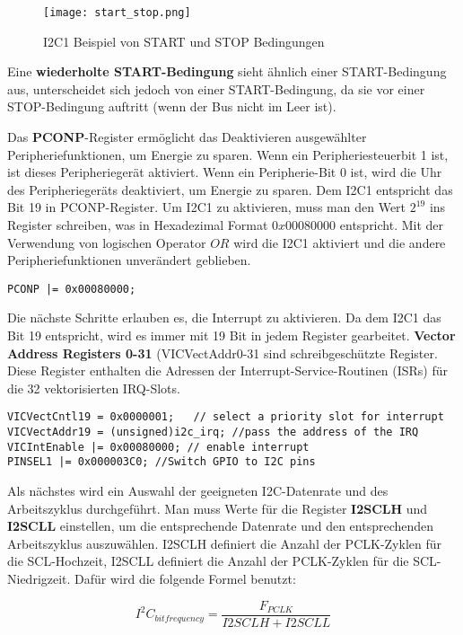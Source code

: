 \begin{figure}[!hb]
	\centering
	\texttt{[image: start\_stop.png]}
	\caption[I2C Beispiel von START und STOP Bedingungen]{I2C1 Beispiel von START und STOP Bedingungen}
	\label{fig:startstop}
\end{figure}

Eine \textbf{wiederholte START-Bedingung} sieht ähnlich einer START-Bedingung aus, unterscheidet sich jedoch von einer START-Bedingung, da sie vor einer STOP-Bedingung auftritt (wenn der Bus nicht im Leer ist).

Das \textbf{PCONP}-Register ermöglicht das Deaktivieren ausgewählter Peripheriefunktionen, um Energie zu sparen. Wenn ein Peripheriesteuerbit 1 ist, ist dieses Peripheriegerät aktiviert. Wenn ein Peripherie-Bit 0 ist, wird die Uhr des Peripheriegeräts deaktiviert, um Energie zu sparen. Dem I2C1 entspricht das Bit 19 in PCONP-Register. Um I2C1 zu aktivieren, muss man den Wert $2^{19}$ ins Register schreiben, was in Hexadezimal Format $0x00080000$ entspricht. Mit der Verwendung von logischen Operator $OR$ wird die I2C1 aktiviert und die andere Peripheriefunktionen unverändert geblieben.
\begin{lstlisting}
PCONP |= 0x00080000;
\end{lstlisting}
Die nächste Schritte erlauben es, die Interrupt zu aktivieren. Da dem I2C1 das Bit 19 entspricht, wird es immer mit 19 Bit in jedem Register gearbeitet. \textbf{Vector Address Registers 0-31} (VICVectAddr0-31 sind schreibgeschützte Register. Diese Register enthalten die Adressen der Interrupt-Service-Routinen (ISRs) für die 32 vektorisierten IRQ-Slots.
\begin{lstlisting}
VICVectCntl19 = 0x0000001;   // select a priority slot for interrupt
VICVectAddr19 = (unsigned)i2c_irq; //pass the address of the IRQ
VICIntEnable |= 0x00080000; // enable interrupt
PINSEL1 |= 0x000003C0; //Switch GPIO to I2C pins
\end{lstlisting}

Als nächstes wird ein Auswahl der geeigneten I2C-Datenrate und des Arbeitszyklus durchgeführt. Man muss Werte für die Register \textbf{I2SCLH} und \textbf{I2SCLL} einstellen, um die entsprechende Datenrate und den entsprechenden Arbeitszyklus auszuwählen. I2SCLH definiert die Anzahl der PCLK-Zyklen für die SCL-Hochzeit, I2SCLL definiert die Anzahl der PCLK-Zyklen für die SCL-Niedrigzeit. Dafür wird die folgende Formel benutzt:

\begin{equation}
I^2C_{bitfrequency} =  \frac{F_{PCLK}}{I2SCLH + I2SCLL }
\end{equation}\\

